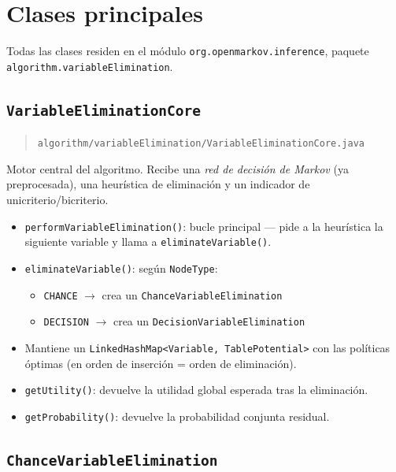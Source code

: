 \documentclass[11pt,a4paper]{article}
\newcommand{\clase}[1]{\texttt{#1}}
\newcommand{\metodo}[1]{\texttt{#1()}}
\newcommand{\paquete}[1]{\texttt{#1}}
\begin{document}
\section{Clases principales}

Todas las clases residen en el m\'{o}dulo \paquete{org.openmarkov.inference},
paquete \paquete{algorithm.variableElimination}.

\subsection{\clase{VariableEliminationCore}}

\begin{quote}
\texttt{algorithm/variableElimination/VariableEliminationCore.java}
\end{quote}

Motor central del algoritmo. Recibe una \emph{red de decisi\'{o}n de Markov}
(ya preprocesada), una heur\'{i}stica de eliminaci\'{o}n y un indicador de
unicriterio/bicriterio.

\begin{itemize}
  \item \metodo{performVariableElimination}: bucle principal --- pide a la
        heur\'{i}stica la siguiente variable y llama a \metodo{eliminateVariable}.
  \item \metodo{eliminateVariable}: seg\'{u}n \clase{NodeType}:
    \begin{itemize}
      \item \texttt{CHANCE} $\rightarrow$ crea un \clase{ChanceVariableElimination}
      \item \texttt{DECISION} $\rightarrow$ crea un \clase{DecisionVariableElimination}
    \end{itemize}
  \item Mantiene un \texttt{LinkedHashMap<Variable, TablePotential>} con las
        pol\'{i}ticas \'{o}ptimas (en orden de inserci\'{o}n = orden de eliminaci\'{o}n).
  \item \metodo{getUtility}: devuelve la utilidad global esperada tras la eliminaci\'{o}n.
  \item \metodo{getProbability}: devuelve la probabilidad conjunta residual.
\end{itemize}

\subsection{\clase{ChanceVariableElimination}}
\end{document}

